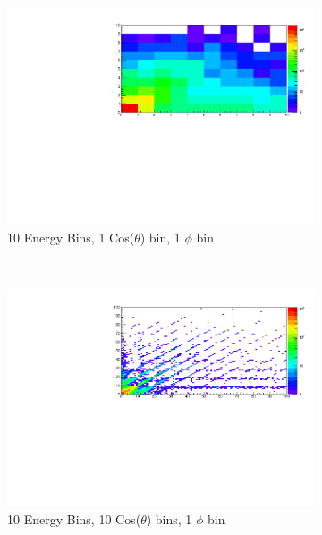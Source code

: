\documentclass[12pt]{article}
\numberwithin{equation}{section}
\numberwithin{figure}{section}
\begin{document}
\begin{figure}
	\centering
	\begin{subfigure}{0.4\textwidth}
                \includegraphics[scale=0.48,trim={5cm 0 0 0}]{Migration_E}
                \caption{10 Energy Bins, 1 Cos($\theta$) bin, 1 $\phi$ bin}
                \label{fig:mig_en}
    \end{subfigure}~~~~~~~~~~~~~~
    \begin{subfigure}{0.4\textwidth}
                \includegraphics[scale=0.48,trim={2cm 0 0 0}]{Migration_E_Cos}
                \caption{10 Energy Bins, 10 Cos($\theta$) bins, 1 $\phi$ bin}
                \label{fig:mig_en_cos}
    \end{subfigure}\\
    \begin{subfigure}{0.4\textwidth}

\end{subfigure}
\end{figure}
\end{document}
